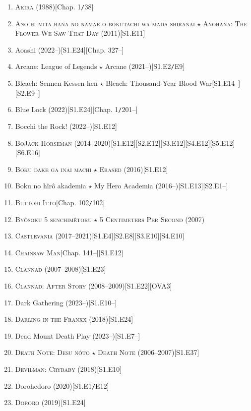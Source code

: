 \documentclass{article}
\begin{document}
\begin{enumerate}
    \item \textsc{Akira} (1988)\hfill[Chap. 1\texttt{/}38]
    \item \textsc{Ano hi mita hana no namae o bokutachi wa mada shiranai $\star$ Anohana: The Flower We Saw That Day} (2011)\hfill[S1.E11]
    \item Aoashi (2022--)\hfill[S1.E24][Chap. 327--]
    \item Arcane: League of Legends $\star$ Arcane (2021--)\hfill[S1.E2\texttt{/}E9]
    \item Bleach: Sennen Kessen-hen $\star$ Bleach: Thousand-Year Blood War\hfill[S1.E14--][S2.E9--]
    \item Blue Lock (2022)\hfill[S1.E24][Chap. 1\texttt{/}201--]
    \item Bocchi the Rock! (2022--)\hfill[S1.E12]
    \item \textsc{BoJack Horseman} (2014--2020)\hfill[S1.E12][S2.E12][S3.E12][S4.E12][S5.E12][S6.E16]
    \item \textsc{Boku dake ga inai machi $\star$ Erased} (2016)\hfill[S1.E12]
    \item Boku no hîrô akademia $\star$ My Hero Academia (2016--)\hfill[S1.E13][S2.E1--]
    \item \textsc{Buttobi Itto}\hfill[Chap. 102\texttt{/}102]
    \item \textsc{By\^osoku 5 senchimêtoru $\star$ 5 Centimeters Per Second} (2007)
    \item \textsc{Castlevania} (2017--2021)\hfill[S1.E4][S2.E8][S3.E10][S4.E10]
    \item \textsc{Chainsaw Man}\hfill[Chap. 141--][S1.E12]
    \item \textsc{Clannad} (2007--2008)\hfill[S1.E23]
    \item \textsc{Clannad: After Story} (2008--2009)\hfill[S1.E22][OVA3]
    \item Dark Gathering (2023--)\hfill[S1.E10--]
    \item \textsc{Darling in the Franxx} (2018)\hfill[S1.E24]
    \item Dead Mount Death Play (2023--)\hfill[S1.E7--]
    \item \textsc{Death Note: Desu n\^oto $\star$ Death Note} (2006--2007)\hfill[S1.E37]
    \item \textsc{Devilman: Crybaby} (2018)\hfill[S1.E10]
    \item Dorohedoro (2020)\hfill[S1.E1\texttt{/}E12]
    \item \textsc{Dororo} (2019)\hfill[S1.E24]

\end{enumerate}
\end{document}
